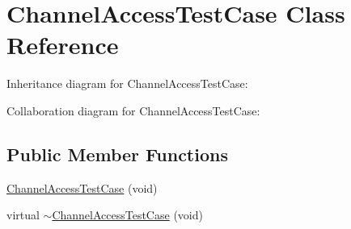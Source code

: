 \hypertarget{classChannelAccessTestCase}{}\section{Channel\+Access\+Test\+Case Class Reference}
\label{classChannelAccessTestCase}


Inheritance diagram for Channel\+Access\+Test\+Case\+:


Collaboration diagram for Channel\+Access\+Test\+Case\+:
\subsection*{Public Member Functions}
\begin{DoxyCompactItemize}
\item 
\hyperlink{classChannelAccessTestCase_acee8199575dd4ab92eb888c427d81eb1}{Channel\+Access\+Test\+Case} (void)
\item 
virtual \hyperlink{classChannelAccessTestCase_a45a69a64e94be24ed0731971e73a4e69}{$\sim$\+Channel\+Access\+Test\+Case} (void)
\end{DoxyCompactItemize}
